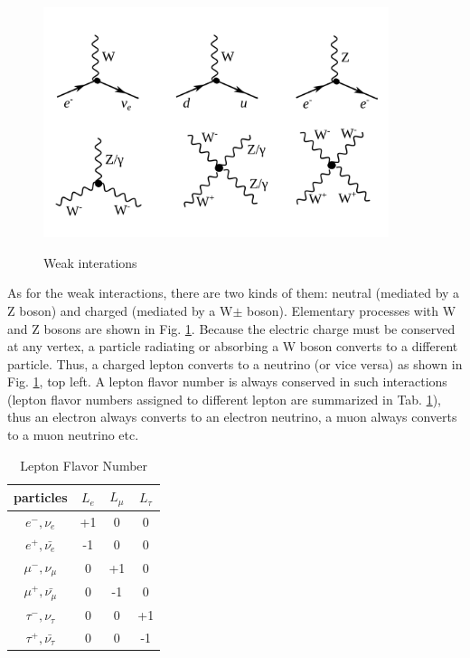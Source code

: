 \begin{figure}[htb]
  \begin{center}
    {\includegraphics[width=0.90\textwidth]{../figs/Intro/feynmW.png}}
    \caption{Weak interations}
    \label{fig:feynmW}
  \end{center}
\end{figure}


As for the weak interactions, there are two kinds of them: neutral (mediated by a Z boson) and charged (mediated by a W$\pm$ boson). Elementary processes with W and Z bosons are shown in Fig. \ref{fig:feynmW}. Because the electric charge must be conserved at any vertex, a particle radiating or absorbing a W boson converts to a different particle. Thus, a charged lepton converts to a neutrino (or vice versa) as shown in Fig. \ref{fig:feynmW}, top left. A lepton flavor number is always conserved in such interactions (lepton flavor numbers assigned to different lepton are summarized in Tab. \ref{tab:LeptonFlavorNumber}), thus an electron always converts to an electron neutrino, a muon always converts to a muon neutrino etc.\\

 \begin{table}[h]
  \begin{center}
  \caption{ Lepton Flavor Number}
  \begin{tabular}{|c|c|c|c|}
     particles & $L_e$ & $L_{\mu}$ & $L_{\tau}$ \\ \hline
     $e^-,\nu_e$ &  +1  &  0  &  0  \\ \hline 
     $e^+, \bar{\nu_e}$ &  -1  &  0  &  0  \\ \hline 
     $\mu^-,\nu_{\mu}$ &  0  &  +1  &  0  \\ \hline 
     $\mu^+, \bar{\nu_{\mu}}$ &  0  &  -1  &  0  \\ \hline 
     $\tau^-,\nu_{\tau}$ &  0  &  0  &  +1  \\ \hline 
     $\tau^+, \bar{\nu_{\tau}}$ &  0  &  0  &  -1  \\ \hline 
  \end{tabular}
  \label{tab:LeptonFlavorNumber}
  \end{center}
 \end{table}

